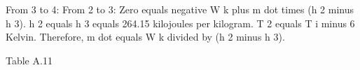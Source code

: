 From 3 to 4:
From 2 to 3:
Zero equals negative W k plus m dot times (h 2 minus h 3).
h 2 equals
h 3 equals 264.15 kilojoules per kilogram.
T 2 equals T i minus 6 Kelvin.
Therefore, m dot equals W k divided by (h 2 minus h 3).

Table A.11